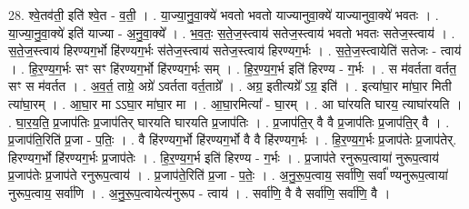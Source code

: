 \documentclass[17pt]{extarticle}
\begin{document}
28. श्वे॒तव॑ती॒ इति॑ श्वे॒त - व॒ती॒ । . या॒ज्या॒नु॒वा॒क्ये॑ भवतो भवतो याज्यानुवा॒क्ये॑ याज्यानुवा॒क्ये॑ भवतः । . या॒ज्या॒नु॒वा॒क्ये॑ इति॑ याज्या - अ॒नु॒वा॒क्ये᳚ । . भ॒व॒तः॒ स॒ते॒ज॒स्त्वाय॑ सतेज॒स्त्वाय॑ भवतो भवतः सतेज॒स्त्वाय॑ । . स॒ते॒ज॒स्त्वाय॑ हिरण्यग॒र्भो हि॑रण्यग॒र्भः स॑तेज॒स्त्वाय॑ सतेज॒स्त्वाय॑ हिरण्यग॒र्भः । . स॒ते॒ज॒स्त्वायेति॑ सतेजः - त्वाय॑ । . हि॒र॒ण्य॒ग॒र्भः सꣳ सꣳ हि॑रण्यग॒र्भो हि॑रण्यग॒र्भः सम् । . हि॒र॒ण्य॒ग॒र्भ इति॑ हिरण्य - ग॒र्भः । . स म॑वर्तता वर्तत॒ सꣳ स म॑वर्तत । . अ॒व॒र्त॒ ताग्रे॒ अग्रे॑ ऽवर्तता वर्त॒ताग्रे᳚ । . अग्र॒ इतीत्यग्रे᳚ ऽग्र॒ इति॑ । . इत्या॑घा॒र मा॑घा॒र मिती त्या॑घा॒रम् । . आ॒घा॒र मा ऽऽघा॒र मा॑घा॒र मा । . आ॒घा॒रमित्या᳚ - घा॒रम् । . आ घा॑रयति घारय॒ त्याघा॑रयति । . घा॒र॒य॒ति॒ प्र॒जाप॑तिः प्र॒जाप॑तिर् घारयति घारयति प्र॒जाप॑तिः । . प्र॒जाप॑ति॒र् वै वै प्र॒जाप॑तिः प्र॒जाप॑ति॒र् वै । . प्र॒जाप॑ति॒रिति॑ प्र॒जा - प॒तिः॒ । . वै हि॑रण्यग॒र्भो हि॑रण्यग॒र्भो वै वै हि॑रण्यग॒र्भः । . हि॒र॒ण्य॒ग॒र्भः प्र॒जाप॑तेः प्र॒जाप॑तेर्. हिरण्यग॒र्भो हि॑रण्यग॒र्भः प्र॒जाप॑तेः । . हि॒र॒ण्य॒ग॒र्भ इति॑ हिरण्य - ग॒र्भः । . प्र॒जाप॑ते रनुरूप॒त्वाया॑ नुरूप॒त्वाय॑ प्र॒जाप॑तेः प्र॒जाप॑ते रनुरूप॒त्वाय॑ । . प्र॒जाप॑ते॒रिति॑ प्र॒जा - प॒तेः॒ । . अ॒नु॒रू॒प॒त्वाय॒ सर्वा॑णि॒ सर्वा᳚ ण्यनुरूप॒त्वाया॑ नुरूप॒त्वाय॒ सर्वा॑णि । . अ॒नु॒रू॒प॒त्वायेत्य॑नुरूप - त्वाय॑ । . सर्वा॑णि॒ वै वै सर्वा॑णि॒ सर्वा॑णि॒ वै । \newline
\end{document}

